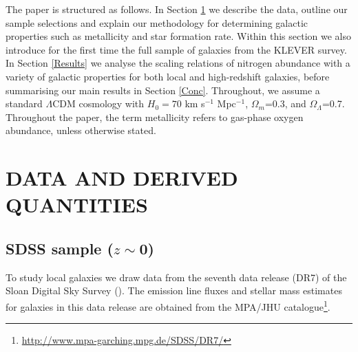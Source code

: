 \documentclass[usenatbib]{mnras} %
\begin{document}
The paper is structured as follows. In Section \ref{all_data} we describe the data, outline our sample selections and explain our methodology for determining galactic properties such as metallicity and star formation rate. Within this section we also introduce for the first time the full sample of galaxies from the KLEVER survey. In Section \ref{Results} we analyse the scaling relations of nitrogen abundance with a variety of galactic properties for both local and high-redshift galaxies, before summarising our main results in Section \ref{Conc}.  Throughout, we assume a standard $\Lambda$CDM cosmology with $H_0 = 70$ km s$^{-1}$ Mpc$^{-1}$, $\Omega_m$=0.3, and $\Omega_{\Lambda}$=0.7. Throughout the paper, the term metallicity refers to gas-phase oxygen abundance, unless otherwise stated.







\section{DATA AND DERIVED QUANTITIES}\label{all_data}

\subsection{SDSS sample ($z\sim$0)}\label{SDSS_into}

To study local galaxies we draw data from the seventh data release (DR7) of the Sloan Digital Sky Survey (\citealt{Abazajian_2009}). The emission line fluxes and stellar mass estimates for galaxies in this data release are obtained from the MPA/JHU catalogue\footnote{\url{http://www.mpa-garching.mpg.de/SDSS/DR7/}}. 
\end{document}
